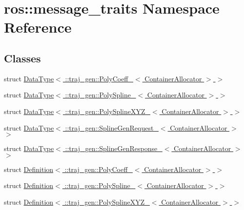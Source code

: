 \hypertarget{namespaceros_1_1message__traits}{}\section{ros\+:\+:message\+\_\+traits Namespace Reference}
\label{namespaceros_1_1message__traits}
\subsection*{Classes}
\begin{DoxyCompactItemize}
\item 
struct \hyperlink{structros_1_1message__traits_1_1_data_type_3_01_1_1traj__gen_1_1_poly_coeff___3_01_container_allocator_01_4_01_4}{Data\+Type$<$ \+::traj\+\_\+gen\+::\+Poly\+Coeff\+\_\+$<$ Container\+Allocator $>$ $>$}
\item 
struct \hyperlink{structros_1_1message__traits_1_1_data_type_3_01_1_1traj__gen_1_1_poly_spline___3_01_container_allocator_01_4_01_4}{Data\+Type$<$ \+::traj\+\_\+gen\+::\+Poly\+Spline\+\_\+$<$ Container\+Allocator $>$ $>$}
\item 
struct \hyperlink{structros_1_1message__traits_1_1_data_type_3_01_1_1traj__gen_1_1_poly_spline_x_y_z___3_01_container_allocator_01_4_01_4}{Data\+Type$<$ \+::traj\+\_\+gen\+::\+Poly\+Spline\+X\+Y\+Z\+\_\+$<$ Container\+Allocator $>$ $>$}
\item 
struct \hyperlink{structros_1_1message__traits_1_1_data_type_3_01_1_1traj__gen_1_1_spline_gen_request___3_01_container_allocator_01_4_01_4}{Data\+Type$<$ \+::traj\+\_\+gen\+::\+Spline\+Gen\+Request\+\_\+$<$ Container\+Allocator $>$ $>$}
\item 
struct \hyperlink{structros_1_1message__traits_1_1_data_type_3_01_1_1traj__gen_1_1_spline_gen_response___3_01_container_allocator_01_4_01_4}{Data\+Type$<$ \+::traj\+\_\+gen\+::\+Spline\+Gen\+Response\+\_\+$<$ Container\+Allocator $>$ $>$}
\item 
struct \hyperlink{structros_1_1message__traits_1_1_definition_3_01_1_1traj__gen_1_1_poly_coeff___3_01_container_allocator_01_4_01_4}{Definition$<$ \+::traj\+\_\+gen\+::\+Poly\+Coeff\+\_\+$<$ Container\+Allocator $>$ $>$}
\item 
struct \hyperlink{structros_1_1message__traits_1_1_definition_3_01_1_1traj__gen_1_1_poly_spline___3_01_container_allocator_01_4_01_4}{Definition$<$ \+::traj\+\_\+gen\+::\+Poly\+Spline\+\_\+$<$ Container\+Allocator $>$ $>$}
\item 
struct \hyperlink{structros_1_1message__traits_1_1_definition_3_01_1_1traj__gen_1_1_poly_spline_x_y_z___3_01_container_allocator_01_4_01_4}{Definition$<$ \+::traj\+\_\+gen\+::\+Poly\+Spline\+X\+Y\+Z\+\_\+$<$ Container\+Allocator $>$ $>$}

\end{DoxyCompactItemize}
